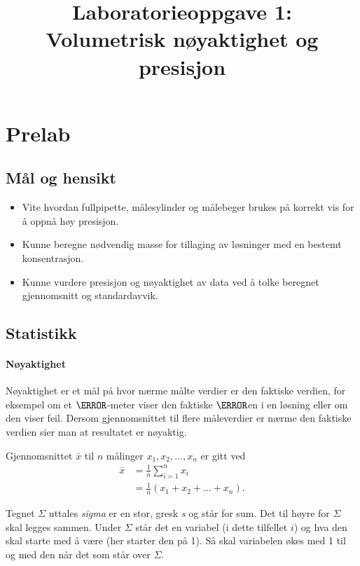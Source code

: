 \documentclass[hidelinks,12pt,norsk,a4paper,fleqn]{scrartcl}
\title{Laboratorieoppgave 1:\\
Volumetrisk nøyaktighet og presisjon}
\author{}
\date{}
\begin{document}
			
	\maketitle
	
	\section{Prelab}
	
	\subsection{Mål og hensikt}
	\begin{itemize}
		\item Vite hvordan fullpipette, målesylinder og målebeger brukes på korrekt vis for å oppnå høy presisjon.
		\item Kunne beregne nødvendig masse for tillaging av løsninger med en bestemt konsentrasjon.
		\item Kunne vurdere presisjon og nøyaktighet av data ved å tolke beregnet gjennomsnitt og standardavvik.
	\end{itemize}
	
	\subsection{Statistikk}
	
	\paragraph{Nøyaktighet}
	Nøyaktighet er et mål på hvor nærme målte verdier er den faktiske verdien, for eksempel om et $\pH$-meter viser den faktiske $\pH$en i en løsning eller om den viser feil. Dersom gjennomsnittet til flere måleverdier er nærme den faktiske verdien sier man at resultatet er nøyaktig.
	
	Gjennomsnittet $\bar{x}$ til $n$ målinger $x_1, x_2, \ldots, x_n$ er gitt ved
	\begin{align*}
		\bar{x} &= \frac{1}{n}\sum_{i=1}^{n}x_i\\
		&=\frac{1}{n}\left(x_1 + x_2 + \dots + x_n\right).
	\end{align*}
	
	Tegnet $\Sigma$ uttales \emph{sigma} er en stor, gresk \emph{s} og står for sum. Det til høyre for $\Sigma$ skal legges sammen. Under $\Sigma$ står det en variabel (i dette tilfellet $i$) og hva den skal starte med å være (her starter den på 1). Så skal variabelen økes med 1 til og med den når det som står over $\Sigma$.
	
\end{document}
